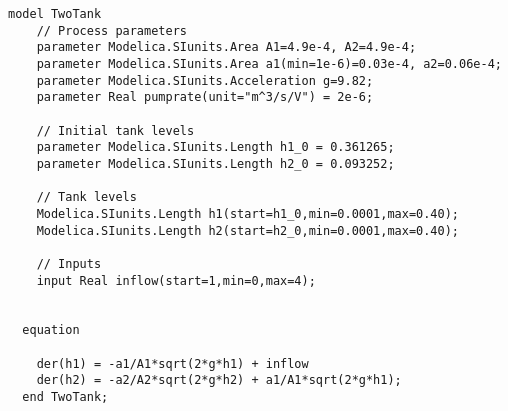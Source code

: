
\lstset{language=modelica}
\begin{lstlisting}
model TwoTank
    // Process parameters
	parameter Modelica.SIunits.Area A1=4.9e-4, A2=4.9e-4;
	parameter Modelica.SIunits.Area a1(min=1e-6)=0.03e-4, a2=0.06e-4;
	parameter Modelica.SIunits.Acceleration g=9.82;
	parameter Real pumprate(unit="m^3/s/V") = 2e-6;

    // Initial tank levels
	parameter Modelica.SIunits.Length h1_0 = 0.361265;
	parameter Modelica.SIunits.Length h2_0 = 0.093252;

    // Tank levels
	Modelica.SIunits.Length h1(start=h1_0,min=0.0001,max=0.40);
	Modelica.SIunits.Length h2(start=h2_0,min=0.0001,max=0.40);

	// Inputs
	input Real inflow(start=1,min=0,max=4);


  equation
    
    der(h1) = -a1/A1*sqrt(2*g*h1) + inflow 
	der(h2) = -a2/A2*sqrt(2*g*h2) + a1/A1*sqrt(2*g*h1);
  end TwoTank;
\end{lstlisting}
